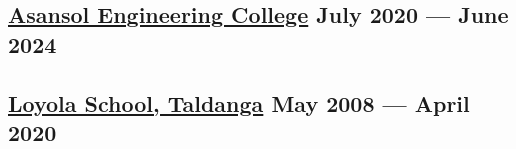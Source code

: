 





\subsection{{\href{http://www.aecwb.edu.in/}{Asansol Engineering College} \hfill July 2020 --- June 2024}}
\begin{null}

\end{null}

\subsection{{\href{https://www.loyolataldanga.com/}{Loyola School, Taldanga} \hfill May 2008 --- April 2020}}
\begin{null}

\end{null}


